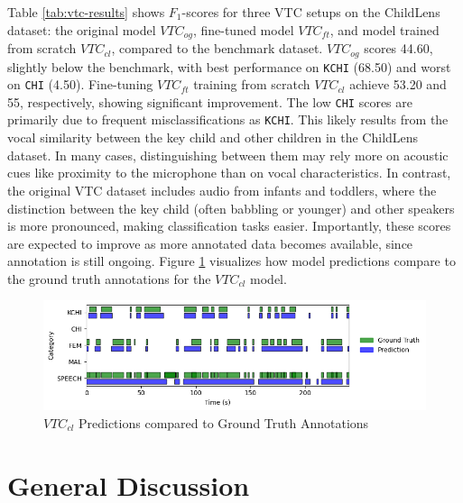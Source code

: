 \documentclass[
  man,floatsintext]{apa6}
\begin{document}
Table \ref{tab:vtc-results} shows \(F_1\)-scores for three VTC setups on the ChildLens dataset: the original model \(VTC_{og}\), fine-tuned model \(VTC_{ft}\), and model trained from scratch \(VTC_{cl}\), compared to the benchmark dataset. \(VTC_{og}\) scores 44.60, slightly below the benchmark, with best performance on \texttt{KCHI} (68.50) and worst on \texttt{CHI} (4.50). Fine-tuning \(VTC_{ft}\) training from scratch \(VTC_{cl}\) achieve 53.20 and 55, respectively, showing significant improvement. The low \texttt{CHI} scores are primarily due to frequent misclassifications as \texttt{KCHI}. This likely results from the vocal similarity between the key child and other children in the ChildLens dataset. In many cases, distinguishing between them may rely more on acoustic cues like proximity to the microphone than on vocal characteristics. In contrast, the original VTC dataset includes audio from infants and toddlers, where the distinction between the key child (often babbling or younger) and other speakers is more pronounced, making classification tasks easier. Importantly, these scores are expected to improve as more annotated data becomes available, since annotation is still ongoing. Figure \ref{fig:vtc-evaluations} visualizes how model predictions compare to the ground truth annotations for the \(VTC_{cl}\) model.

\begin{figure}

{\centering \includegraphics[width=1\linewidth]{images/vtc_performance_evaluation_184452} 

}

\caption{\( VTC_{cl} \) Predictions compared to Ground Truth Annotations}\label{fig:vtc-evaluations}
\end{figure}

\section{General Discussion}\label{general-discussion}
\end{document}
